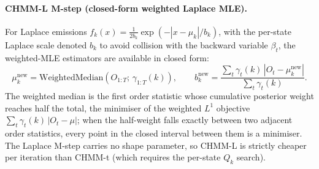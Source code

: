 \paragraph{CHMM-L M-step (closed-form weighted Laplace MLE).}
For Laplace emissions $f_k(x) = \tfrac{1}{2 b_k} \exp(-|x - \mu_k|/b_k)$, with the per-state Laplace scale denoted $b_k$ to avoid collision with the backward variable $\beta_t$, the weighted-MLE estimators are available in closed form:
\begin{equation}
    \mu_k^{\text{new}} = \text{WeightedMedian}\!\left(O_{1:T};\, \gamma_{1:T}(k)\right),\qquad
    b_k^{\text{new}} = \frac{\sum_t \gamma_t(k)\, |O_t - \mu_k^{\text{new}}|}{\sum_t \gamma_t(k)}.
    \label{eq:lupdate_supp}
\end{equation}
The weighted median is the first order statistic whose cumulative posterior weight reaches half the total, the minimiser of the weighted $L^1$ objective $\sum_t \gamma_t(k)\,|O_t - \mu|$; when the half-weight falls exactly between two adjacent order statistics, every point in the closed interval between them is a minimiser.
The Laplace M-step carries no shape parameter, so CHMM-L is strictly cheaper per iteration than CHMM-t (which requires the per-state $Q_k$ search).


